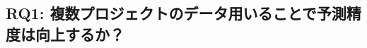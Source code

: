\documentclass[submit,noauthor,ses,dvipdfmx]{ipsj}
\begin{document}



\subsection{RQ1: 複数プロジェクトのデータ用いることで予測精度は向上するか？}

\end{document}
